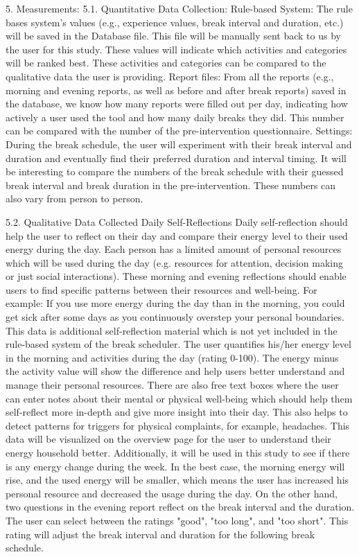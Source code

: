 \documentclass{hasel_thesis}
\begin{document}
5.	Measurements:
5.1.	Quantitative Data Collection:
Rule-based System:
The rule bases system's values (e.g., experience values, break interval and duration, etc.) will be saved in the Database file. This file will be manually sent back to us by the user for this study. These values will indicate which activities and categories will be ranked best. These activities and categories can be compared to the qualitative data the user is providing. 
Report files:
From all the reports (e.g., morning and evening reports, as well as before and after break reports) saved in the database, we know how many reports were filled out per day, indicating how actively a user used the tool and how many daily breaks they did. This number can be compared with the number of the pre-intervention questionnaire. 
Settings:
During the break schedule, the user will experiment with their break interval and duration and eventually find their preferred duration and interval timing. It will be interesting to compare the numbers of the break schedule with their guessed break interval and break duration in the pre-intervention. These numbers can also vary from person to person.

5.2.	Qualitative Data Collected
Daily Self-Reflections
Daily self-reflection should help the user to reflect on their day and compare their energy level to their used energy during the day. Each person has a limited amount of personal resources which will be used during the day (e.g. resources for attention, decision making or just social interactions). These morning and evening reflections should enable users to find specific patterns between their resources and well-being. For example: If you use more energy during the day than in the morning, you could get sick after some days as you continuously overstep your personal boundaries. This data is additional self-reflection material which is not yet included in the rule-based system of the break scheduler. The user quantifies his/her energy level in the morning and activities during the day (rating 0-100). The energy minus the activity value will show the difference and help users better understand and manage their personal resources. There are also free text boxes where the user can enter notes about their mental or physical well-being which should help them self-reflect more in-depth and give more insight into their day. This also helps to detect patterns for triggers for physical complaints, for example, headaches. This data will be visualized on the overview page for the user to understand their energy household better. Additionally, it will be used in this study to see if there is any energy change during the week. In the best case, the morning energy will rise, and the used energy will be smaller, which means the user has increased his personal resource and decreased the usage during the day. 
On the other hand, two questions in the evening report reflect on the break interval and the duration. The user can select between the ratings "good", "too long", and "too short". This rating will adjust the break interval and duration for the following break schedule.
\end{document}
